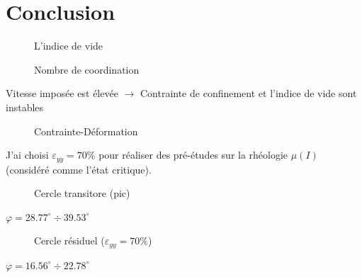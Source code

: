 \documentclass[a4paper,12pt]{report}
\begin{document}
\begin{table}
\chapter{Conclusion}

                                \begin{figure}
                                    \centering
                                  \small
                                  
                                    \caption{L'indice de vide}
                                \end{figure}
                                    
                                \begin{figure}
                                   
                                    \caption{Nombre de coordination}
                                \end{figure}

                                Vitesse imposée est élevée $\rightarrow$ Contrainte de confinement et l'indice de vide sont instables

     
                                \begin{figure}
                                    
                                    \caption{Contrainte-Déformation}
                                \end{figure}
                                J'ai choisi $\varepsilon_{yy} = 70\%$ pour réaliser des pré-études sur la rhéologie $\mu(I)$ (considéré comme l'état critique). 


                                \begin{figure}
                                  
                                    \caption{Cercle transitore (pic)}
                                \end{figure}

                                    $\varphi = 28.77^\circ \div 39.53^\circ $


                                \begin{figure}
                                    
                                    \caption{Cercle résiduel ($\varepsilon_{yy} = 70\%$)}
                                \end{figure}
                                    $\varphi = 16.56^\circ \div 22.78^\circ $
                                    

\end{table}
\end{document}
